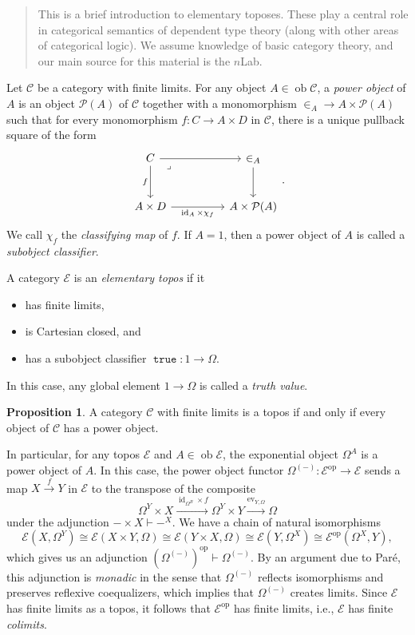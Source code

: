 \documentclass[10pt,letterpaper,cm]{nupset}
\theoremstyle{definition}
\theoremstyle{theorem}
\newtheorem{prop}[definition]{Proposition}
\theoremstyle{remark}
\renewcommand{\P}{\mathcal P}
\newcommand{\1}{\mathbf{1}}
\renewcommand{\c}{\mathscr{C}}
\newcommand{\e}{\mathscr{E}}
\newcommand{\0}{\vec 0}
\DeclareMathOperator*{\ev}{ev}
\DeclareMathOperator{\id}{id}
\DeclareMathOperator{\true}{\mathtt{true}}
\DeclareMathOperator{\op}{op}
\DeclareMathOperator{\ob}{ob}
\newcommand{\bi}{\begin{itemize}}
\newcommand{\ei}{\end{itemize}}
\begin{document}
\begin{abstract}
This is a brief introduction to elementary toposes. These play a central role in categorical semantics of dependent type theory (along with other areas of categorical logic). We assume knowledge of basic category theory, and our main source for this material is the $n$Lab.
\end{abstract}

\bigskip

Let $\c$ be a category with finite limits. For any object $A \in \ob{\c}$, a \textit{power object} of $A$ is  an object $\P(A)$ of $\c$ together with a monomorphism $\in_A  \to A \times \P(A)$ such that for every monomorphism $ f: C \to A \times D$ in $\c$, there is a unique pullback square of the form
\[
\begin{tikzcd}[column sep=huge, row sep=large, ampersand replacement=\&]
	C \& \in_A \\
	A \times D \& A \times \P(A)
	\arrow[from=1-2, to=2-2]
	\arrow["f"', from=1-1, to=2-1]
	\arrow["{\id_A \times \chi_f}"', from=2-1, to=2-2]
	\arrow[from=1-1, to=1-2]
	\arrow["\lrcorner"{anchor=center, pos=0.125}, draw=none, from=1-1, to=2-2]
\end{tikzcd}
.\] We call $\chi_f$ the \textit{classifying map} of $f$. If $A = 1$, then a power object of $A$ is called a \textit{subobject classifier}.

\medskip

A category $\e$ is an  \textit{elementary topos} if it
\bi
\item has finite limits,
\item is Cartesian closed, and
\item has a subobject classifier $\true : 1 \to \Omega$.
\ei
In this case, any global element $1 \to \Omega$  is called a \textit{truth value}. 

\begin{prop}\label{power}
A category $\c$ with finite limits is a topos if and only if every object of $\c$ has a power object. 
\end{prop}

In particular, for any topos $\e$ and $A\in \ob{\e}$, the exponential object $\Omega^A$ is a power object of $A$. In this case, the power object functor $\Omega^{\left({-}\right)} : \e^{\op} \to \e$ sends a map  $X \xrightarrow{f} Y$ in $\e$ to the transpose of the composite 
\[
\Omega^Y \times X \xrightarrow{\id_{\Omega^B} \times f}  \Omega^{Y} \times Y \xrightarrow{\ev_{Y, \Omega}} \Omega
\] under the adjunction ${-} \times X \vdash {-}^X$. We have a chain of natural isomorphisms
\[
\e(X, \Omega^Y) \cong \e(X \times Y, \Omega) \cong \e(Y \times X, \Omega) \cong \e(Y, \Omega^X) \cong \e^{\op}(\Omega^X, Y)
,\] which gives us an adjunction $\left(\Omega^{\left({-}\right)}\right)^{\op} \vdash \Omega^{\left({-}\right)}$. 
By an argument due to Par\'e, this adjunction is \textit{monadic} in the sense that $\Omega^{\left({-}\right)}$ reflects isomorphisms and preserves reflexive coequalizers, which implies that $\Omega^{\left({-}\right)}$ creates limits. Since $\e$ has finite limits as a topos, it follows that $\e^{\op}$ has finite limits, i.e., $\e$ has finite \emph{colimits}.
\end{document}
